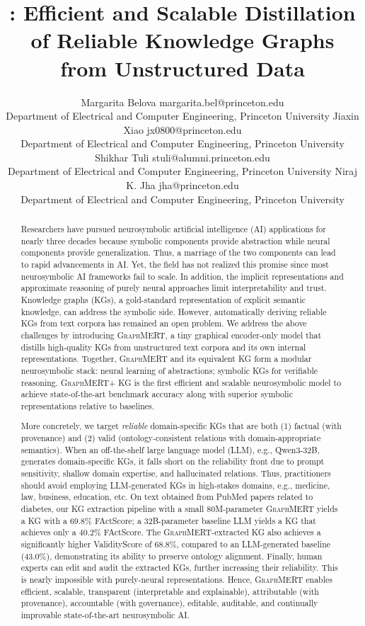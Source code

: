 \documentclass[10pt]{article}
\title{\ours: Efficient and Scalable Distillation of Reliable Knowledge Graphs from Unstructured Data}
\author{\name Margarita Belova \email margarita.bel@princeton.edu \\
       \addr Department of Electrical and Computer Engineering, Princeton University
\AND
       \name Jiaxin Xiao \email jx0800@princeton.edu \\
       \addr Department of Electrical and Computer Engineering, Princeton University
\AND
       \name Shikhar Tuli \email stuli@alumni.princeton.edu \\
       \addr Department of Electrical and Computer Engineering, Princeton University
\AND
       \name Niraj K. Jha \email jha@princeton.edu \\
       \addr Department of Electrical and Computer Engineering, Princeton University
}
\date{}
\newcommand{\ours}{\textsc{GraphMERT}\xspace}
\begin{document}
\maketitle

\begin{abstract}
Researchers have pursued neurosymbolic artificial intelligence (AI) applications for nearly three decades because symbolic components provide abstraction while neural components provide generalization. Thus, a marriage of the two components can lead to rapid advancements in AI. Yet, the field has not realized this promise since most neurosymbolic AI frameworks fail to scale. In addition, the implicit representations and approximate reasoning of purely neural approaches limit interpretability and trust. Knowledge graphs (KGs), a gold-standard representation of explicit semantic knowledge, can address the symbolic side. However, automatically deriving reliable KGs from text corpora has remained an open problem. We address the above challenges by introducing \ours, a tiny graphical encoder-only model that distills high-quality KGs from unstructured text corpora and its own internal representations. Together, \ours and its equivalent KG form a modular neurosymbolic stack: neural learning of abstractions; symbolic KGs for verifiable reasoning. \ours + KG is the first efficient and scalable neurosymbolic model to achieve state-of-the-art benchmark accuracy along with superior symbolic representations relative to baselines.

More concretely, we target \emph{reliable} domain-specific KGs that are both (1) factual (with provenance) and (2) valid (ontology-consistent relations with domain-appropriate semantics). When an off-the-shelf large language model (LLM), e.g., Qwen3-32B, generates domain-specific KGs, it falls short on the reliability front due to prompt sensitivity, shallow domain expertise, and hallucinated relations. Thus, practitioners should avoid employing LLM-generated KGs in high-stakes domains, e.g., medicine, law, business, education, etc. On text obtained from PubMed papers related to diabetes, our KG extraction pipeline with a small 80M-parameter \ours yields a KG with a 69.8\% FActScore; a 32B-parameter baseline LLM yields a KG that achieves only a 40.2\% FActScore. The \ours-extracted KG also achieves a significantly higher ValidityScore of 68.8\%, compared to an LLM-generated baseline (43.0\%), demonstrating its ability to preserve ontology alignment. Finally, human experts can edit and audit the extracted KGs, further increasing their reliability. This is nearly impossible with purely-neural representations. Hence, \ours enables efficient, scalable, transparent (interpretable and explainable), attributable (with provenance), accountable (with governance), editable, auditable, and continually improvable state-of-the-art neurosymbolic AI.


\end{abstract}
\end{document}
